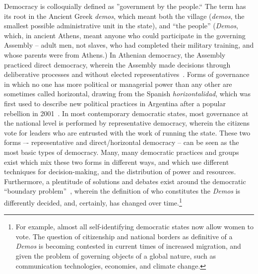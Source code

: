 Democracy is colloquially defined as ''government by the people.`` The term has
its root in the Ancient Greek \textit{demos}, which meant both the village (\textit{demos}, the
smallest possible administrative unit in the state), and ``the people'' (\textit{Demos},
which, in ancient Athens, meant anyone who could participate in the governing
Assembly -- adult men, not slaves, who had completed their military training,
and whose parents were from Athens.) In Athenian democracy, the Assembly
practiced direct democracy, wherein the Assembly made decisions through
deliberative processes and without elected representatives~\cite{blackwell2003athenian}. Forms of
governance in which no one has more political or managerial power than any other
are sometimes called horizontal, drawing from the Spanish \textit{horizontalidad}, which
was first used to describe new political practices in Argentina after a popular
rebellion in 2001~\cite{sitrin2012everyday}. In most contemporary democratic states, most governance at the national level is performed by representative democracy,
wherein the citizens vote for leaders who are entrusted with the work of running
the state. These two forms –- representative and direct/horizontal democracy --
can be seen as the most basic types of democracy. Many, many democratic
practices and groups exist which mix these two forms in different ways, and
which use different techniques for decision-making, and the distribution of
power and resources. Furthermore, a plentitude of solutions and debates exist
around the democratic ``boundary problem''~\cite{sep-global-democracy}, wherein the definition of
who constitutes the \textit{Demos} is differently decided, and, certainly, has changed
over time.\footnote{For example, almost all self-identifying democratic states
now allow women to vote. The question of citizenship and national borders as
definitive of a \textit{Demos} is becoming contested in current times of increased
migration, and given the problem of governing objects of a global nature, such
as communication technologies, economies, and climate change.}

